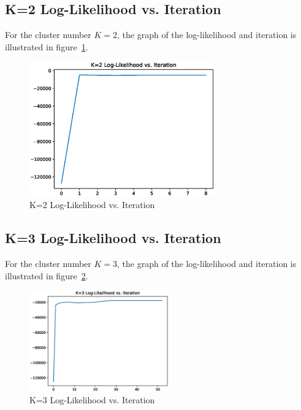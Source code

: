 \documentclass[11pt, a4paper]{article}
\begin{document}
\newpage

\subsection{K=2 Log-Likelihood vs. Iteration}

For the cluster number $K=2$, the graph of the log-likelihood and iteration is illustrated in figure~\ref{fig:kf9}.

\begin{figure}[htbp]
	
	\centering 
	\includegraphics[width=8cm]{6_2.eps}
	
	\caption{K=2 Log-Likelihood vs. Iteration}
	\label{fig:kf9}
	
\end{figure}

\subsection{K=3 Log-Likelihood vs. Iteration}

For the cluster number $K=3$, the graph of the log-likelihood and iteration is illustrated in figure~\ref{fig:kf10}.

\begin{figure}[htbp]
	
	\centering 
	\includegraphics[width=6cm]{6_3.eps}
	
	\caption{K=3 Log-Likelihood vs. Iteration}
	\label{fig:kf10}
	
\end{figure}
\end{document}
